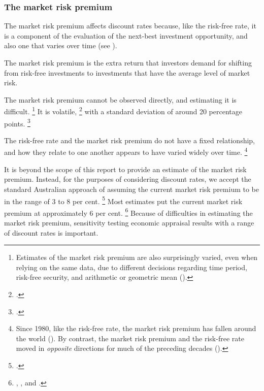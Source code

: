 \documentclass{grattan}
\begin{document}
\subsubsection{The market risk premium}

The market risk premium affects discount rates because, like the risk-free rate, it is a component of the evaluation of the next-best investment opportunity, and also one that varies over time (see ). 

The market risk premium is the extra return that investors demand for shifting from risk-free investments to investments that have the average level of market risk. 

The market risk premium cannot be observed directly, and estimating it is difficult.%
\footnote{Estimates of the market risk premium are also surprisingly varied, even when relying on the same data, due to different decisions regarding time period, risk-free security, and arithmetic or geometric mean (\textcite[][88--90]{Damodaran-Valuation}).}
It is volatile,%
    \footcite[][5]{Jorda-etal-2017-rate-of-return-on-everything}
with a standard deviation of around 20 percentage points.%
    \footcite[][39]{Harrison-Valuing-the-Future}

The risk-free rate and the market risk premium do not have a fixed relationship, and how they relate to one another appears to have varied widely over time.%
\footnote{Since 1980, like the risk-free rate, the market risk premium has fallen around the world (\textcites{Jorda-etal-2017-rate-of-return-on-everything} {Cochrane-Stock-gyrations}). By contrast, the market risk premium and the risk-free rate moved in \emph{opposite} directions for much of the preceding decades (\textcite[][Figure~10 on p.~30]{Jorda-etal-2017-rate-of-return-on-everything}).} 

It is beyond the scope of this report to provide an estimate of the market risk premium. Instead, for the purposes of considering discount rates, we accept the standard Australian approach of assuming the current market risk premium to be in the range of 3 to 8 per cent.%
    \footcite[][39]{Harrison-Valuing-the-Future}
Most estimates put the current market risk premium at approximately 6 per cent.%
    \footnote{\textcite{Victorian-government-2016-Partnerships-Victoria-financial-guidance}, \textcite{Commonwealth-government-2008-PPP-guidelines}, and \textcite{Western-Australia-PPP-guidelines-PSC-policy-2013}.}
Because of difficulties in estimating the market risk premium, sensitivity testing economic appraisal results with a range of discount rates is important.  
\end{document}
